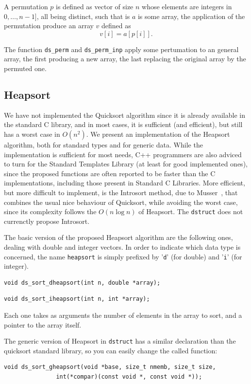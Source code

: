 A permutation $p$ is defined as vector of size $n$ whose elements are
integers in $0,\ldots,n-1]$, all being distinct, such that is $a$ is
some array, the application of the permutation produce an array $v$
defined as
\[
  v[i] = a[p[i]].
\]

The function \verb|ds_perm| and \verb|ds_perm_inp| apply some
pertumation to an general array, the first producing a new array, the
last replacing the original array by the permuted one.

\subsection{Heapsort}

We have not implemented the Quicksort algorithm since it is already
available in the standard C library, and in most cases, it is
sufficient (and efficient), but still has a worst case in $O(n^2)$.
We present an implementation of the Heapsort algorithm, both for
standard types and for generic data.
While the implementation is sufficient for most needs, 
C++ programmers are also adviced to turn for the Standard Templates
Library (at least for good implemented ones), since the proposed
functions are often reported to be faster than the C implementations,
including those present in Standard C Libraries.
More efficient, but more difficult to implement, is the Introsort
method, due to Musser~\cite{Muss97}, that combines the usual nice
behaviour of Quicksort, while avoiding the worst case, since its
complexity follows the $O(n \log n)$ of Heapsort.
The \verb|dstruct| does not currenctly propose Introsort.

The basic version of the proposed Heapsort algorithm are the following
ones, dealing with double and integer vectors. In order to indicate
which data type is concerned, the name \verb|heapsort| is simply
prefixed by '\verb|d|' (for double) and '\verb|i|' (for integer).
\begin{verbatim}
void ds_sort_dheapsort(int n, double *array);
\end{verbatim}
\begin{verbatim}
void ds_sort_iheapsort(int n, int *array);
\end{verbatim}
Each one takes as arguments the number of elements in the array to
sort, and a pointer to the array itself.

The generic version of Heapsort in \verb|dstruct| has a similar
declaration than the quicksort standard library, so you can easily
change the called function:
\begin{verbatim}
void ds_sort_gheapsort(void *base, size_t nmemb, size_t size,
		       int(*compar)(const void *, const void *));
\end{verbatim}

